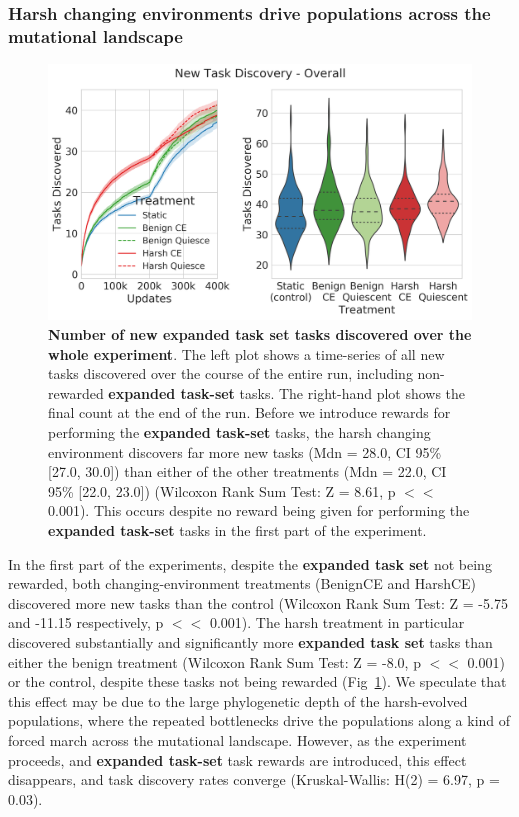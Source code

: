\documentclass[10pt,letterpaper,final]{article}
\begin{document}
\subsubsection*{Harsh changing environments drive populations across the mutational landscape}
	\begin{figure}[!h]
	\includegraphics[width=0.95\columnwidth]{figures/LTE/lte-simple-overall_task_discovery.png}
	\caption{\textbf{Number of new expanded task set tasks discovered over the whole experiment}. The left plot shows a time-series of all new tasks discovered over the course of the entire run, including non-rewarded \textbf{expanded task-set} tasks. The right-hand plot shows the final count at the end of the run. Before we introduce rewards for performing the \textbf{expanded task-set} tasks, the harsh changing environment discovers far more new tasks (Mdn = 28.0, CI 95\% [27.0, 30.0]) than either of the other treatments (Mdn = 22.0, CI 95\% [22.0, 23.0]) (Wilcoxon Rank Sum Test: Z = 8.61, p $<<$ 0.001). This occurs despite no reward being given for performing the \textbf{expanded task-set} tasks in the first part of the experiment. %
	}
	\label{fig:simple-overall_task_discovery}
	\end{figure}

In the first part of the experiments, despite the \textbf{expanded task set} not being rewarded, both changing-environment treatments (BenignCE and HarshCE) discovered more new tasks than the control (Wilcoxon Rank Sum Test: Z = -5.75 and -11.15 respectively, p $<<$ 0.001). The harsh treatment in particular discovered substantially and significantly more \textbf{expanded task set} tasks than either the benign treatment (Wilcoxon Rank Sum Test: Z = -8.0, p $<<$ 0.001) or the control, despite these tasks not being rewarded (Fig~\ref{fig:simple-overall_task_discovery}). We speculate that this effect may be due to the large phylogenetic depth of the harsh-evolved populations, where the repeated bottlenecks drive the populations along a kind of forced march across the mutational landscape. However, as the experiment proceeds, and \textbf{expanded task-set} task rewards are introduced, this effect disappears, and task discovery rates converge (Kruskal-Wallis: H(2) = 6.97, p = 0.03).
\end{document}
